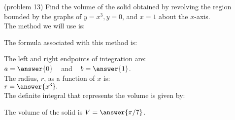 \documentclass{ximera}
\begin{document}
\begin{problem}(problem 13)
Find the volume of the solid obtained by revolving the region bounded by the graphs of $y = x^3, y = 0$, and $x = 1$ about the $x$-axis.\\
The method we will use is:
\begin{multipleChoice}
\end{multipleChoice}

The formula associated with this method is:
\begin{multipleChoice}
\end{multipleChoice}

The left and right endpoints of integration are:\\
$a = \answer{0}\;\;\;$ and $\;\;\; b = \answer{1}$.\\
The radius, $r$, as a function of $x$ is:\\
$r = \answer{x^3}.$\\

The definite integral that represents the volume is given by:\\
\begin{multipleChoice}
\end{multipleChoice}

The volume of the solid is $V = \answer{\pi/7}$.

\end{problem}
\end{document}
